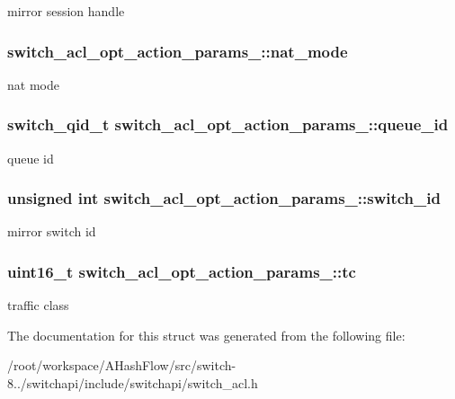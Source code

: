 mirror session handle \hypertarget{structswitch__acl__opt__action__params___a10f98e3d7a7d9a7c89cd19f8cdc7e0c7}{
\subsubsection[{nat\+\_\+mode}]{ switch\+\_\+acl\+\_\+opt\+\_\+action\+\_\+params\+\_\+\+::nat\+\_\+mode}}\label{structswitch__acl__opt__action__params___a10f98e3d7a7d9a7c89cd19f8cdc7e0c7}
nat mode \hypertarget{structswitch__acl__opt__action__params___ad0ad0767eda1ff0b1802993f3c613bc9}{
\subsubsection[{queue\+\_\+id}]{\setlength{\rightskip}{0pt plus 5cm}switch\+\_\+qid\+\_\+t switch\+\_\+acl\+\_\+opt\+\_\+action\+\_\+params\+\_\+\+::queue\+\_\+id}}\label{structswitch__acl__opt__action__params___ad0ad0767eda1ff0b1802993f3c613bc9}
queue id \hypertarget{structswitch__acl__opt__action__params___ac015d7727a6af66735d176f0ef8219ce}{
\subsubsection[{switch\+\_\+id}]{\setlength{\rightskip}{0pt plus 5cm}unsigned int switch\+\_\+acl\+\_\+opt\+\_\+action\+\_\+params\+\_\+\+::switch\+\_\+id}}\label{structswitch__acl__opt__action__params___ac015d7727a6af66735d176f0ef8219ce}
mirror switch id \hypertarget{structswitch__acl__opt__action__params___abf088a2001ccab5f8193b3a79b4a00ea}{
\subsubsection[{tc}]{\setlength{\rightskip}{0pt plus 5cm}uint16\+\_\+t switch\+\_\+acl\+\_\+opt\+\_\+action\+\_\+params\+\_\+\+::tc}}\label{structswitch__acl__opt__action__params___abf088a2001ccab5f8193b3a79b4a00ea}
traffic class 

The documentation for this struct was generated from the following file\+:\begin{DoxyCompactItemize}
\item 
/root/workspace/\+A\+Hash\+Flow/src/switch-\/8../switchapi/include/switchapi/switch\+\_\+acl.\+h\end{DoxyCompactItemize}
